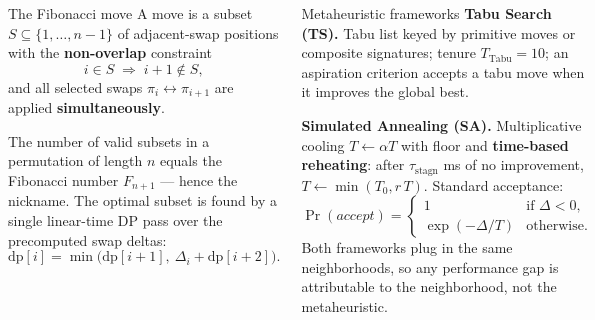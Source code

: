 \documentclass[final]{beamer}
\begin{document}
\begin{frame}
{\begin{columns}
\begin{block}{The Fibonacci move}
\vspace*{2mm}
A move is a subset $S \subseteq \{1,\dots,n{-}1\}$ of adjacent-swap
positions with the \textbf{non-overlap} constraint
\[
  i \in S \;\Longrightarrow\; i+1 \notin S,
\]
and all selected swaps $\pi_i \leftrightarrow \pi_{i+1}$ are applied
\textbf{simultaneously}.

\vspace{3mm}
\begin{center}
\end{center}

\vspace{2mm}
The number of valid subsets in a permutation of length $n$ equals the
Fibonacci number $F_{n+1}$ --- hence the nickname. The optimal subset is
found by a single linear-time DP pass over the precomputed swap deltas:
\[
  \mathrm{dp}[i] = \min\!\bigl(\mathrm{dp}[i+1],\ \Delta_i + \mathrm{dp}[i+2]\bigr).
\]
\vspace*{1mm}
\end{block}

\vspace*{6mm}

\begin{block}{Metaheuristic frameworks}
\vspace*{2mm}
\textbf{Tabu Search (TS).} Tabu list keyed by primitive moves or
composite signatures; tenure $T_{\text{Tabu}}=10$; an aspiration
criterion accepts a tabu move when it improves the global best.

\vspace{2mm}
\textbf{Simulated Annealing (SA).} Multiplicative cooling
$T\leftarrow\alpha T$ with floor and \textbf{time-based reheating}: after
$\tau_{\text{stagn}}$ ms of no improvement, $T\leftarrow\min(T_0,r\,T)$.
Standard acceptance:
\[
  \Pr(\textit{accept}) =
  \begin{cases}
    1 & \text{if } \Delta < 0,\\[1mm]
    \exp(-\Delta/T) & \text{otherwise}.
  \end{cases}
\]
Both frameworks plug in the same neighborhoods, so any performance gap
is attributable to the neighborhood, not the metaheuristic.
\vspace*{2mm}
\end{block}


\end{columns}}
\end{frame}
\end{document}
